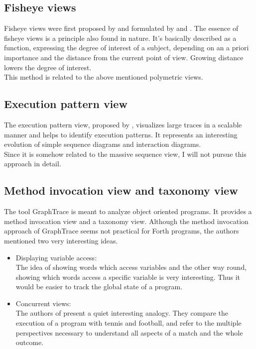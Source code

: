 \subsection*{Fisheye views}
Fisheye views were first proposed by \cite{Furnas:1986:GFV:22627.22342} and formulated by \cite{Storey:1995:GLA:647547.728600} and \cite{Sarkar:1994:GFV:198366.198384}. The essence of fisheye views is a principle also found in nature. It's basically described as a function, expressing the degree of interest of a subject, depending on an a priori importance and the distance from the current point of view. Growing distance lowers the degree of interest.
\\
This method is related to the above mentioned polymetric views.

\subsection*{Execution pattern view}
The execution pattern view, proposed by \cite{Pauw98executionpatterns}, visualizes large traces in a scalable manner and helps to identify execution patterns. It represents an interesting evolution of simple sequence diagrams and interaction diagrams.
\\
Since it is somehow related to the massive sequence view, I will not pursue this approach in detail.

\subsection*{Method invocation view and taxonomy view}
The tool \gls{GraphTrace}\cite{Kleyn:1988:GOS:62084.62101} is meant to analyze object oriented programs. It provides a method invocation view and a taxonomy view. Although the method invocation approach of GraphTrace seems not practical for Forth programs, the authors mentioned two very interesting ideas.
\begin{itemize}
\item Displaying variable access:\\
	The idea of showing words which access variables and the other way round, showing which words access a specific variable is very interesting. Thus it would be easier to track the global state of a program.
\item Concurrent views:\\
	The authors of \cite{Kleyn:1988:GOS:62084.62101} present a quiet interesting analogy. They compare the execution of a program with tennis and football, and refer to the multiple perspectives necessary to understand all aspects of a match and the whole outcome.
\end{itemize}


